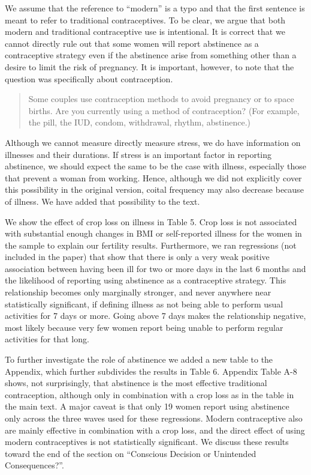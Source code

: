\documentclass[letterpaper,12pt]{article}
\begin{document}
\begin{enumerate}
[RESPONSE:] 


We assume that the reference to ``modern'' is a typo and that the
first sentence is meant to refer to traditional contraceptives.
To be clear, we argue that both modern and traditional contraceptive
use is intentional.
It is correct that we cannot directly rule out that some women will 
report abstinence as a contraceptive strategy even if the abstinence 
arise from something other than a desire to limit the risk of pregnancy.
It is important, however, to note that the question was specifically
about contraception.

\begin{quote}
Some couples use contraception methods to avoid pregnancy or to
space births. Are you currently using a method of contraception?
(For example, the pill, the IUD, condom, withdrawal, rhythm,
abstinence.)
\end{quote}


Although we cannot measure directly measure stress, we do have information 
on illnesses and their durations.
If stress is an important factor in reporting abstinence, we should
expect the same to be the case with illness, especially those that 
prevent a woman from working.
Hence, although we did not explicitly cover this possibility in the original 
version, coital frequency may also decrease because of illness.
We have added that possibility to the text.


We show the effect of crop loss on illness in Table 5.
Crop loss is  not associated with substantial enough changes in BMI or 
self-reported illness for the women in the sample to explain our fertility results.
Furthermore, we ran regressions (not included in the paper) that show that there 
is only a very weak positive association between having been ill for two or more 
days in the last 6 months and the likelihood of reporting using abstinence 
as a contraceptive strategy.
This relationship becomes only marginally stronger, and never anywhere near
statistically significant, if defining illness as not being able to
perform usual activities for 7 days or more.
Going above 7 days makes the relationship negative, most likely because
very few women report being unable to perform regular activities for that
long.

To further investigate the role of abstinence we added a new
table to the Appendix, which further subdivides the results in Table 6.
Appendix Table A-8 shows, not surprisingly, that abstinence is the most 
effective traditional contraception, although only in combination 
with a crop loss as in the table in the main text.
A major caveat is that only 19 women report using abstinence only
across the three waves used for these regressions.
Modern contraceptive also are mainly effective in combination with
a crop loss, and the direct effect of using modern contraceptives
is not statistically significant.
We discuss these results toward the end of the section on 
``Conscious Decision or Unintended Consequences?''.




\end{enumerate}
\end{document}
